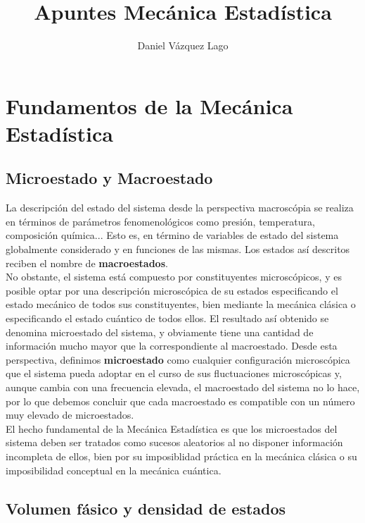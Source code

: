 \documentclass[12pt,a4paper]{article}
\title{Apuntes Mecánica Estadística}
\author{Daniel Vázquez Lago}
\numberwithin{equation}{section}
\numberwithin{figure}{section}
\theoremstyle{definition}
\begin{document}
\maketitle

\newpage

\tableofcontents

\newpage

\section{Fundamentos de la Mecánica Estadística}

\subsection{Microestado y Macroestado}

La descripción del estado del sistema desde la perspectiva macroscópia se realiza en términos de parámetros fenomenológicos como presión, temperatura, composición química... Esto es, en término de variables de estado del sistema globalmente considerado y en funciones de las mismas. Los estados así descritos reciben el nombre de \textbf{macroestados}. \\

No obstante, el sistema está compuesto por constituyentes microscópicos, y es posible optar por una descripción microscópica de su estados especificando el estado mecánico de todos sus constituyentes, bien mediante la mecánica clásica o especificando el estado cuántico de todos ellos. El resultado así obtenido se denomina microestado del sistema, y obviamente tiene una cantidad de información mucho mayor que la correspondiente al macroestado. Desde esta perspectiva, definimos \textbf{microestado} como cualquier configuración microscópica que el sistema pueda adoptar en el curso de sus fluctuaciones microscópicas y, aunque cambia con una frecuencia elevada, el macroestado del sistema no lo hace, por lo que debemos concluir que cada macroestado es compatible con un número muy elevado de microestados. \\

El hecho fundamental de la Mecánica Estadística es que los microestados del sistema deben ser tratados como sucesos aleatorios al no disponer información incompleta de ellos, bien por su imposiblidad práctica en la mecánica clásica o su imposibilidad conceptual en la mecánica cuántica. 

\subsection{Volumen fásico y densidad de estados}
\end{document}
